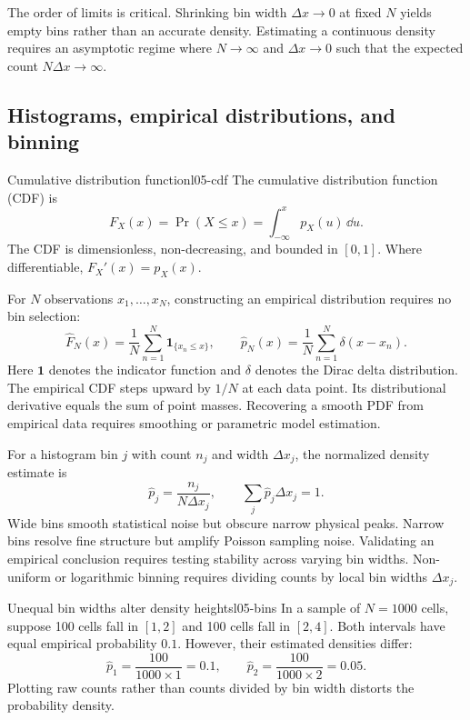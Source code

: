 The order of limits is critical. Shrinking bin width $\Delta x \to 0$ at fixed $N$ yields empty bins rather than an accurate density. Estimating a continuous density requires an asymptotic regime where $N \to \infty$ and $\Delta x \to 0$ such that the expected count $N\Delta x \to \infty$.

\subsection{Histograms, empirical distributions, and binning}
\label{subsec:l05-cdf}
\begin{definition}{Cumulative distribution function}{l05-cdf}
The cumulative distribution function (CDF) is
\begin{equation}
F_X(x)=\Pr(X\leq x)=\int_{-\infty}^x p_X(u)\,\dd u.
\label{eq:l05-cdf}
\end{equation}
The CDF is dimensionless, non-decreasing, and bounded in $[0, 1]$. Where differentiable, $F_X'(x)=p_X(x)$.
\end{definition}
For $N$ observations $x_1,\ldots,x_N$, constructing an empirical distribution requires no bin selection:
\begin{equation}
\widehat F_N(x)=\frac1N\sum_{n=1}^N\mathbf{1}_{\{x_n\leq x\}},
\qquad
\widehat p_N(x)=\frac1N\sum_{n=1}^N\delta(x-x_n).
\label{eq:l05-empirical}
\end{equation}
Here $\mathbf{1}$ denotes the indicator function and $\delta$ denotes the Dirac delta distribution. The empirical CDF steps upward by $1/N$ at each data point. Its distributional derivative equals the sum of point masses. Recovering a smooth PDF from empirical data requires smoothing or parametric model estimation.

For a histogram bin $j$ with count $n_j$ and width $\Delta x_j$, the normalized density estimate is
\begin{equation}
\widehat p_j=\frac{n_j}{N\Delta x_j},\qquad
\sum_j\widehat p_j\Delta x_j=1.
\label{eq:l05-histogram}
\end{equation}
Wide bins smooth statistical noise but obscure narrow physical peaks. Narrow bins resolve fine structure but amplify Poisson sampling noise. Validating an empirical conclusion requires testing stability across varying bin widths. Non-uniform or logarithmic binning requires dividing counts by local bin widths $\Delta x_j$.

\begin{example}{Unequal bin widths alter density heights}{l05-bins}
In a sample of $N=1000$ cells, suppose 100 cells fall in $[1, 2]$ and 100 cells fall in $[2, 4]$. Both intervals have equal empirical probability $0.1$. However, their estimated densities differ:
\begin{equation}
\widehat{p}_1 = \frac{100}{1000 \times 1} = 0.1, \qquad \widehat{p}_2 = \frac{100}{1000 \times 2} = 0.05.
\end{equation}
Plotting raw counts rather than counts divided by bin width distorts the probability density.
\end{example}

